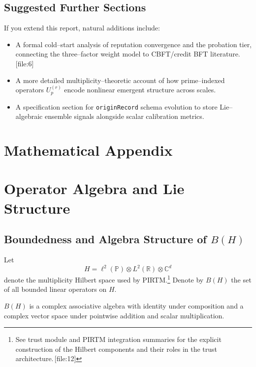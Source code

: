 \documentclass[11pt]{article}
\begin{document}
\subsection{Suggested Further Sections}

If you extend this report, natural additions include:

\begin{itemize}[leftmargin=*]
  \item A formal cold--start analysis of reputation convergence and the
  probation tier, connecting the three--factor weight model to CBFT/credit
  BFT literature.\,[file:6]
  \item A more detailed multiplicity--theoretic account of how prime--indexed
  operators \(U_p^{(r)}\) encode nonlinear emergent structure across scales.
  \item A specification section for \texttt{originRecord} schema evolution to
  store Lie--algebraic ensemble signals alongside scalar calibration metrics.
\end{itemize}

\appendix
\section*{Mathematical Appendix}

\section{Operator Algebra and Lie Structure}

\subsection{Boundedness and Algebra Structure of \texorpdfstring{$B(H)$}{B(H)}}

Let
\[
  H = \ell^2(\mathbb{P}) \otimes L^2(\mathbb{R}) \otimes \mathbb{C}^d
\]
denote the multiplicity Hilbert space used by PIRTM.\footnote{See trust module
and PIRTM integration summaries for the explicit construction of the Hilbert
components and their roles in the trust architecture.\,[file:12]} Denote by
\(B(H)\) the set of all bounded linear operators on \(H\).

\begin{lemma}
\(B(H)\) is a complex associative algebra with identity under composition and
a complex vector space under pointwise addition and scalar multiplication.
\end{lemma}
\end{document}
